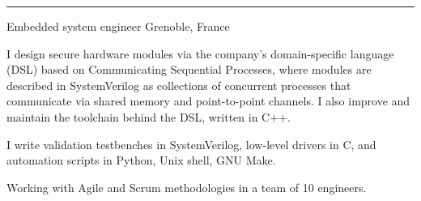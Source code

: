\vspace{+2mm}\vspace{-3mm}
\rule{\textwidth}{0.5pt}\vspace{-1mm}

\begin{cventries}
\vspace{-5mm}

\cventry
{}
{\vspace{-9mm}Embedded system engineer } %
{\vspace{-9mm}\normalcolor Grenoble, France} %
{} %
{
\begin{cvitems}
\item{I design secure hardware modules via the company's domain-specific 
language (DSL) based on Communicating Sequential Processes, 
where modules are described in SystemVerilog as collections of concurrent 
processes that communicate via shared memory and point-to-point channels. I 
also improve and maintain the toolchain 
behind the DSL, written in C++.}
\item{I write validation testbenches in SystemVerilog, low-level drivers 
in C, and automation scripts in Python, Unix shell, GNU Make.}
\item{Working with Agile and Scrum methodologies in a team of 10 engineers.}
\end{cvitems}
}
\vspace{-5mm}


\end{cventries}
